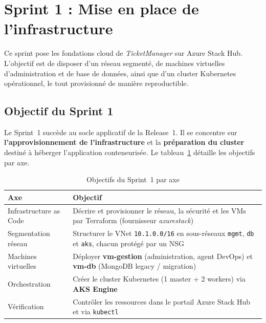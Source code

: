 
\section[Sprint 1 : Mise en place de l'infrastructure]%
{Sprint 1 : Mise en place de l'infrastructure}

Ce sprint pose les fondations cloud de \textit{TicketManager} sur Azure Stack Hub.
L'objectif est de disposer d'un réseau segmenté, de machines virtuelles d'administration
et de base de données, ainsi que d'un cluster Kubernetes opérationnel, le tout
provisionné de manière reproductible.


\subsection{Objectif du Sprint 1}

Le Sprint~1 succède au socle applicatif de la Release~1. Il se concentre sur
\textbf{l'approvisionnement de l'infrastructure} et la \textbf{préparation du cluster}
destiné à héberger l'application conteneurisée. Le tableau~\ref{tab:r2-s1-objectifs} détaille
les objectifs par axe.

\begin{table}[H]
\centering
\caption{Objectifs du Sprint~1 par axe}
\label{tab:r2-s1-objectifs}
\footnotesize
\renewcommand{\arraystretch}{1.1}
\setlength{\tabcolsep}{6pt}
\begin{tabular}{|p{2.8cm}|p{9.2cm}|}
\hline
\textbf{Axe} & \textbf{Objectif} \\
\hline
Infrastructure as Code &
  Décrire et provisionner le réseau, la sécurité et les VMs par Terraform
  (fournisseur \textit{azurestack}) \\
\hline
Segmentation réseau &
  Structurer le VNet \texttt{10.1.0.0/16} en sous-réseaux \texttt{mgmt}, \texttt{db}
  et \texttt{aks}, chacun protégé par un NSG \\
\hline
Machines virtuelles &
  Déployer \textbf{vm-gestion} (administration, agent DevOps) et \textbf{vm-db}
  (MongoDB legacy / migration) \\
\hline
Orchestration &
  Créer le cluster Kubernetes (1 master + 2 workers) via \textbf{AKS Engine} \\
\hline
Vérification &
  Contrôler les ressources dans le portail Azure Stack Hub et via \texttt{kubectl} \\
\hline
\end{tabular}
\end{table}

